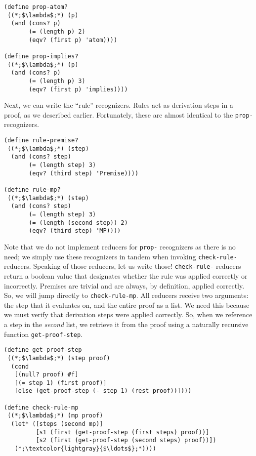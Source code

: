 \begin{cl}[]{}\begin{lstlisting}[language=MyScheme]
(define prop-atom?
 ((*;$\lambda$;*) (p)
  (and (cons? p)
       (= (length p) 2)
       (eqv? (first p) 'atom))))

(define prop-implies?
 ((*;$\lambda$;*) (p)
  (and (cons? p)
       (= (length p) 3)
       (eqv? (first p) 'implies))))
\end{lstlisting}\end{cl}
Next, we can write the ``rule'' recognizers. Rules act as derivation steps in a proof, as we described earlier. Fortunately, these are almost identical to the \texttt{prop-} recognizers.
\begin{cl}[]{}\begin{lstlisting}[language=MyScheme]
(define rule-premise?
 ((*;$\lambda$;*) (step)
  (and (cons? step)
       (= (length step) 3)
       (eqv? (third step) 'Premise))))

(define rule-mp?
 ((*;$\lambda$;*) (step)
  (and (cons? step)
       (= (length step) 3)
       (= (length (second step)) 2)
       (eqv? (third step) 'MP))))
\end{lstlisting}\end{cl}
Note that we do not implement reducers for \texttt{prop-} recognizers as there is no need; we simply use these recognizers in tandem when invoking \texttt{check-rule-} reducers. Speaking of those reducers, let us write those! \texttt{check-rule-} reducers return a boolean value that designates whether the rule was applied correctly or incorrectly. Premises are trivial and are always, by definition, applied correctly. So, we will jump directly to \texttt{check-rule-mp}. All reducers receive two arguments: the step that it evaluates on, and the entire proof as a list. We need this because we must verify that derivation steps were applied correctly. So, when we reference a step in the \textit{second} list, we retrieve it from the proof using a naturally recursive function 
\texttt{get-proof-step}.

\begin{cl}[]{}\begin{lstlisting}[language=MyScheme]
(define get-proof-step
 ((*;$\lambda$;*) (step proof)
  (cond
   [(null? proof) #f]
   [(= step 1) (first proof)]
   [else (get-proof-step (- step 1) (rest proof))])))
      
(define check-rule-mp
 ((*;$\lambda$;*) (mp proof)
  (let* ([steps (second mp)]
         [s1 (first (get-proof-step (first steps) proof))]
         [s2 (first (get-proof-step (second steps) proof))])
   (*;\textcolor{lightgray}{$\ldots$};*))))
\end{lstlisting}\end{cl}

